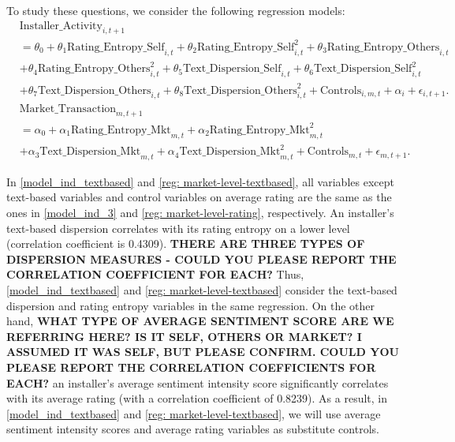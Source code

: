 \documentclass[msom,blindrev]{informs3}
\begin{document}
	To study these questions, we consider the following regression models:
	\begin{align}  \nonumber
	& \text{Installer\_Activity}_{i,t+1} \\ \nonumber
	& = \theta_{0}+ \theta_{1} \text{Rating\_Entropy\_Self}_{i,t}+ \theta_{2} \text{Rating\_Entropy\_Self}_{i,t}^ {2} + \theta_{3} \text{Rating\_Entropy\_Others}_{i,t} \\ \nonumber
	& + \theta_{4} \text{Rating\_Entropy\_Others}_{i,t}^{2} + \theta_{5} \text{Text\_Dispersion\_Self}_{i,t}+  \theta_{6}  \text{Text\_Dispersion\_Self}_{i,t}^ {2}  \\ \label{model_ind_textbased}
	&+ \theta_{7}  \text{Text\_Dispersion\_Others}_{i,t} + \theta_{8} \text{Text\_Dispersion\_Others}_{i,t}^{2}  + \text{Controls}_{i,m,t}+ \alpha_{i} + \epsilon_{i,t+1}.\\ \nonumber
	& \text{Market\_Transaction}_{m,t+1} \\ \nonumber
	& =  \alpha_{0} + \alpha_{1} \text{Rating\_Entropy\_Mkt}_{m,t}+  \alpha_{2} \text{Rating\_Entropy\_Mkt}_{m,t}^2 \\ \label{reg: market-level-textbased}
	&+ \alpha_{3} \text{Text\_Dispersion\_Mkt}_{m,t}+ \alpha_{4} \text{Text\_Dispersion\_Mkt}_{m,t}^2  + \text{Controls}_{m,t}  + \epsilon_{m,t+1}.
	\end{align}
	
	In \eqref{model_ind_textbased} and \eqref{reg: market-level-textbased}, all variables except text-based variables and control variables on average rating are the same as the ones in \eqref{model_ind_3} and \eqref{reg: market-level-rating}, respectively. An installer's text-based dispersion correlates with its rating entropy on a lower level (correlation coefficient is 0.4309). \textbf{THERE ARE THREE TYPES OF DISPERSION MEASURES -  COULD YOU PLEASE REPORT THE CORRELATION COEFFICIENT FOR EACH?} Thus, \eqref{model_ind_textbased} and \eqref{reg: market-level-textbased} consider the text-based dispersion and rating entropy variables in the same regression. On the other hand,
	\textbf{WHAT TYPE OF AVERAGE SENTIMENT SCORE ARE WE REFERRING HERE? IS IT SELF, OTHERS OR MARKET? I ASSUMED IT WAS SELF, BUT PLEASE CONFIRM. COULD YOU PLEASE REPORT THE CORRELATION COEFFICIENTS FOR EACH?} an installer's average sentiment intensity score significantly correlates with its average rating (with a correlation coefficient of 0.8239). As a result, in \eqref{model_ind_textbased} and \eqref{reg: market-level-textbased},  we will use average sentiment intensity scores and average rating variables as substitute controls.
	
\end{document}
